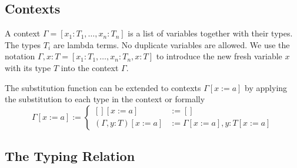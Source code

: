 \subsection{Contexts}

\begin{definition}
  A context $\Gamma = [x_1:T_1, \ldots, x_n:T_n]$ is a list of variables
  together with their types. The types $T_i$ are lambda terms. No duplicate
  variables are allowed. We use the notation
  $\Gamma,x:T = [x_1:T_1, \ldots, x_n:T_n, x:T]$ to introduce the new fresh
  variable $x$ with its type $T$ into the context $\Gamma$.
\end{definition}

The substitution function can be extended to contexts $\Gamma[x:=a]$ by
applying the substitution to each type in the context or formally
$$
\Gamma[x:=a] :=
\begin{cases}
  [][x:=a] &:= []
  \\
  (\Gamma,y:T)[x:=a] &:= \Gamma[x:=a],y:T[x:=a]
\end{cases}
$$



\subsection{The Typing Relation}

